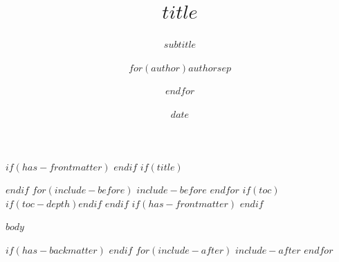\documentclass[
$if(fontsize)$
  $fontsize$,
$else$
  12pt,
$endif$
$if(papersize)$
  $papersize$paper,
$else$
  letterpaper,
$endif$
  spanish,
  DIV=11,
  numbers=noendperiod]{scrreprt}
\title{$title$}
\subtitle{$subtitle$}
\author{$for(author)$$author$$sep$ \and $endfor$}
\date{$date$}
\begin{document}
$if(has-frontmatter)$
\frontmatter
$endif$
$if(title)$
\maketitle
$endif$
$for(include-before)$
$include-before$
$endfor$
$if(toc)$
{
\hypersetup{linkcolor=}
$if(toc-depth)$\setcounter{tocdepth}{$toc-depth$}$endif$
\tableofcontents
\clearpage
}
$endif$
$if(has-frontmatter)$
\mainmatter
$endif$

$body$

$if(has-backmatter)$
\backmatter
$endif$
$for(include-after)$
$include-after$
$endfor$
\end{document}
